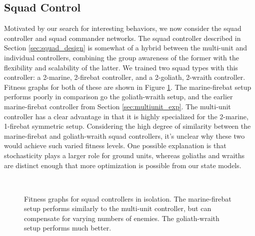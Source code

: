 \documentclass[a4paper]{article}
\begin{document}
\subsection{Squad Control}

Motivated by our search for interesting behaviors, we now consider the squad controller and squad commander networks. The squad controller described in Section \ref{sec:squad_design} is somewhat of a hybrid between the multi-unit and individual controllers, combining the group awareness of the former with the flexibility and scalability of the latter. We trained two squad types with this controller: a 2-marine, 2-firebat controller, and a 2-goliath, 2-wraith controller. Fitness graphs for both of these are shown in Figure \ref{fig:squads_exp}. The marine-firebat setup performs poorly in comparison go the goliath-wraith setup, and the earlier marine-firebat controller from Section \ref{sec:multiunit_exp}. The multi-unit controller has a clear advantage in that it is highly specialized for the 2-marine, 1-firebat symmetric setup. Considering the high degree of similarity between the marine-firebat and goliath-wraith squad controllers, it's unclear why these two would achieve such varied fitness levels. One possible explanation is that stochasticity plays a larger role for ground units, whereas goliaths and wraiths are distinct enough that more optimization is possible from our state models.

\begin{figure}
\centering
\mbox{\quad
{}}
\caption{Fitness graphs for squad controllers in isolation. The marine-firebat setup performs similarly to the multi-unit controller, but can compensate for varying numbers of enemies. The goliath-wraith setup performs much better.}
\label{fig:squads_exp}
\end{figure}
\end{document}
